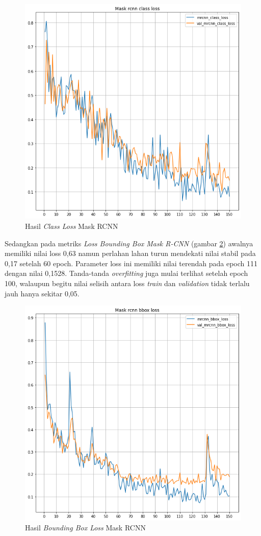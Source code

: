 \begin{figure}[h!]
  \begin{center}
    \includegraphics[width= 0.55\linewidth]{bab4/2. MRCNN_Class_Loss.png}
    \caption{Hasil \textit{Class Loss} Mask RCNN}
    \label{fig: Class Loss Mask RCNN}
  \end{center}
\end{figure}

Sedangkan pada metriks \textit{Loss Bounding Box Mask R-CNN} (gambar \ref{fig: Bounding Box Loss Mask RCNN})
awalnya memiliki nilai loss 0,63 namun perlahan lahan turun mendekati nilai stabil pada 0,17 setelah 
60 epoch. Parameter loss ini memiliki nilai terendah pada epoch 111 dengan nilai 0,1528. Tanda-tanda
\textit{overfitting} juga mulai terlihat setelah epoch 100, walaupun begitu nilai selisih antara loss
\textit{train} dan \textit{validation} tidak terlalu jauh hanya sekitar 0,05.

\begin{figure}[h!]
  \begin{center}
    \includegraphics[width= 0.55\linewidth]{bab4/4. MRCNN_Bbox_Loss.png}
    \caption{Hasil \textit{Bounding Box Loss} Mask RCNN}
    \label{fig: Bounding Box Loss Mask RCNN}
  \end{center}
\end{figure}

